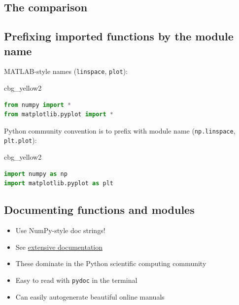 \documentclass[%
oneside,                 %
final,                   %
10pt]{article}
\newenvironment{_cod_tight}[1]{
   \def\FrameCommand{\colorbox{#1}}
   \FrameRule0.6pt\MakeFramed {\FrameRestore}\vskip3mm}
   {\vskip0mm\endMakeFramed}
\newenvironment{cod}[1]{
\bgroup\rmfamily
\fboxsep=0mm\relax
\begin{_cod_tight}{#1}
\list{}{\parsep=-2mm\parskip=0mm\topsep=0pt\leftmargin=2mm
\rightmargin=2\leftmargin\leftmargin=4pt\relax}
\item\relax}
{\endlist\end{_cod_tight}\egroup}
\begin{document}
\subsection*{The comparison}


\subsection*{Prefixing imported functions by the module name}

MATLAB-style names (\texttt{linspace}, \texttt{plot}):

\begin{cod}{cbg_yellow2}\begin{lstlisting}[language=Python,style=simple,xleftmargin=2mm]
from numpy import *
from matplotlib.pyplot import *
\end{lstlisting}\end{cod}
\noindent

Python community convention is to prefix with module name
(\texttt{np.linspace}, \texttt{plt.plot}):

\begin{cod}{cbg_yellow2}\begin{lstlisting}[language=Python,style=simple,xleftmargin=2mm]
import numpy as np
import matplotlib.pyplot as plt
\end{lstlisting}\end{cod}
\noindent


\subsection*{Documenting functions and modules}
\label{softeng1:basic:docstring}

\begin{itemize}
 \item Use NumPy-style doc strings!

 \item See \href{{https://github.com/numpy/numpy/blob/master/doc/HOWTO_DOCUMENT.rst.txt}}{extensive documentation}

 \item These dominate in the Python scientific computing community

 \item Easy to read with \texttt{pydoc} in the terminal

 \item Can easily autogenerate beautiful online manuals
\end{itemize}
\end{document}

